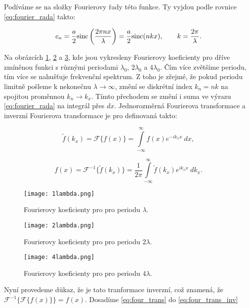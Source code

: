 Podíváme se na složky Fourierovy řady této funkce. Ty vyjdou podle rovnice \eqref{eq:fourier_rada} takto: 

\begin{equation}
c_n = \frac{a}{2}{\rm sinc}\left( \frac{2 \pi n x}{\lambda} \right) = \frac{a}{2}{\rm sinc} (n k x), \qquad k=\frac{2 \pi}{\lambda}.
\end{equation}

Na obrázcích \ref{fig:lambda}, \ref{fig:2lambda} a \ref{fig:4lambda}, kde jsou vykresleny Fourierovy koeficienty pro dříve zmíněnou funkci s různými periodami $\lambda_0$, $2\lambda_0$ a $4\lambda_0$. Čím více zvětšíme periodu, tím více se nahušťuje frekvenční spektrum. Z toho je zřejmé, že pokud periodu limitně pošleme k nekonečnu $\lambda \rightarrow \infty$, změní se diskrétní index $k_n=n k$ na spojitou proměnnou $k_n \rightarrow k_x$. Tímto přechodem se změní i suma ve výrazu \eqref{eq:fourier_rada} na integrál přes $dx$. Jednorozměrná Fourierova transformace a inverzní Fourierova transformace je pro definovaná takto:

\begin{equation}\label{eq:four_trans}
\widetilde{f}(k_x) = \mathscr{F}\{f(x)\} = \int\limits_{-\infty}^{\infty} f(x) e^{-i k_x x}~ dx,
\end{equation}

\begin{equation}\label{eq:four_trans_inv}
f(x) = \mathscr{F}^{-1}\{\widetilde{f}(k_x)\} = \frac{1}{2 \pi}\int\limits_{-\infty}^{\infty} \widetilde{f}(k_x) e^{i k_x x}~ dk_x.
\end{equation}

\begin{figure}[h]
\center
\texttt{[image: 1lambda.png]}
\caption{Fourierovy koeficienty pro pro periodu $\lambda$.}
\label{fig:lambda}
\end{figure}

\begin{figure}[h]
\center
\texttt{[image: 2lambda.png]}
\caption{Fourierovy koeficienty pro pro periodu $2\lambda$.}
\label{fig:2lambda}
\end{figure}

\begin{figure}[h]
\center
\texttt{[image: 4lambda.png]}
\caption{Fourierovy koeficienty pro pro periodu $4\lambda$.}
\label{fig:4lambda}
\end{figure}


Nyní provedeme důkaz, že je tato tranformace inverzní, což znamená, že $\mathscr{F}^{-1}\{\mathscr{F}\{f(x)\}\} = f(x)$. Dosadíme \ref{eq:four_trans} do \eqref{eq:four_trans_inv}

